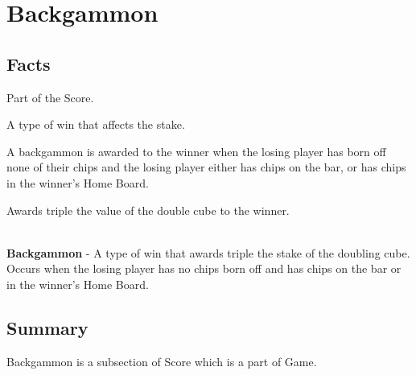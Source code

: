 \section{Backgammon}

\subsection{Facts}
\begin{dashed}
    \item Part of the Score.
    \item A type of win that affects the stake.
    \item A backgammon is awarded to the winner when the losing player has born off none of their chips and the losing player either has chips on the bar, or has chips in the winner's Home Board.
    \item Awards triple the value of the double cube to the winner.
\end{dashed}

\noindent \\
\textbf{Backgammon} - A type of win that awards triple the stake of the doubling cube. Occurs when the losing player has no chips born off and has chips on the bar or in the winner's Home Board.

\subsection{Summary}
Backgammon is a subsection of Score which is a part of Game.
